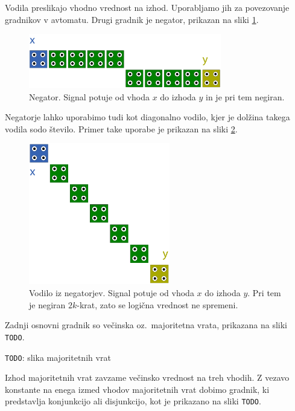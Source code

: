 \documentclass[a4paper, 11pt]{article}
\newcommand{\todo}{\textcolor{BrickRed}{\texttt{TODO}}} %
\begin{document}
Vodila preslikajo vhodno vrednost na izhod.
Uporabljamo jih za povezovanje gradnikov v avtomatu.
Drugi gradnik je negator, prikazan na sliki \ref{img-pregled-negator}.

\begin{figure}[h]
	\centering
	\includegraphics[width=0.75\textwidth]{../img/pregled/negator.pdf}
	\caption{Negator. Signal potuje od vhoda $x$ do izhoda $y$ in je pri tem negiran.}
	\label{img-pregled-negator}
\end{figure}

Negatorje lahko uporabimo tudi kot diagonalno vodilo, kjer je dolžina takega vodila sodo število.
Primer take uporabe je prikazan na sliki \ref{img-pregled-negbus}.

\begin{figure}[h]
	\centering
	\includegraphics[width=0.55\textwidth]{../img/pregled/negbus.pdf}
	\caption{Vodilo iz negatorjev. Signal potuje od vhoda $x$ do izhoda $y$. Pri tem je negiran $2k$-krat, zato se logična vrednost ne spremeni.}
	\label{img-pregled-negbus}
\end{figure}

Zadnji osnovni gradnik so večinska oz.~majoritetna vrata, prikazana na sliki \todo.

\todo: slika majoritetnih vrat

Izhod majoritetnih vrat zavzame večinsko vrednost na treh vhodih.
Z vezavo konstante na enega izmed vhodov majoritetnih vrat dobimo gradnik, ki predstavlja konjunkcijo ali disjunkcijo, kot je prikazano na sliki \todo.
\end{document}
